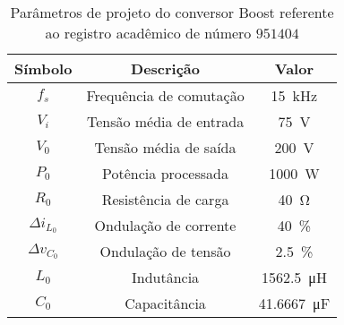 \begin{table}[!ht]
\centering
\caption{Parâmetros de projeto do conversor Boost referente ao registro acadêmico de número $951404$}
\label{tab:parametros}
\begin{tabular}{@{}ccc@{}}
\toprule
\textbf{Símbolo} & \textbf{Descrição} & \textbf{Valor}\\ \midrule
$f_s$ & Frequência de comutação & \SI{15}{\kilo\hertz}\\
$V_i$ & Tensão média de entrada  & \SI{75}{\V}\\
$V_0$ & Tensão média de saída  & \SI{200}{\V} \\
$P_0$ & Potência processada  & \SI{1000}{\W} \\
$R_0$ & Resistência de carga & \SI{40}{\ohm} \\
$\Delta{i_{L_0}}$  & Ondulação de corrente & \SI{40}{\%}\\
$\Delta{v_{C_0}}$  & Ondulação de tensão & \SI{2.5}{\%}\\
$L_0$ & Indutância & \SI{1562.5}{\micro\henry}\\
$C_0$ & Capacitância & \SI{41.6667}{\micro\farad}\\
\bottomrule
\end{tabular}
\end{table}


